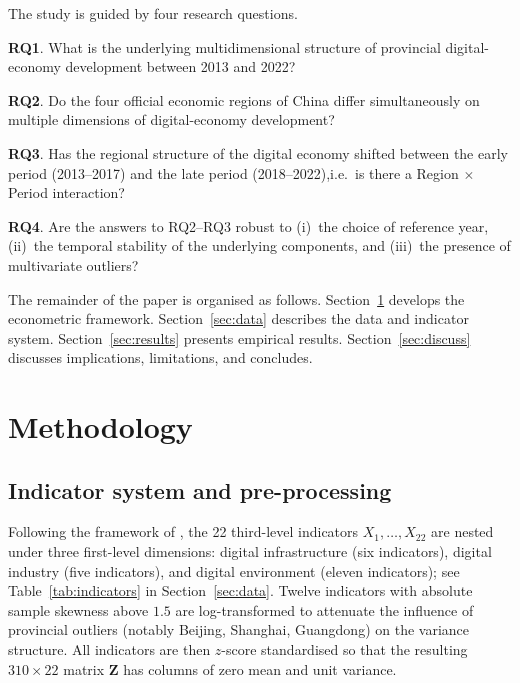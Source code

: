\documentclass[12pt,letterpaper]{article}
\begin{document}
The study is guided by four research questions.

\textbf{RQ1}. What is the underlying multidimensional structure of provincial digital-economy development between 2013 and 2022?

\textbf{RQ2}. Do the four official economic regions of China differ simultaneously on multiple dimensions of digital-economy development?

\textbf{RQ3}. Has the regional structure of the digital economy shifted between the early period (2013--2017) and the late period (2018--2022),i.e.~is there a Region $\times$ Period interaction?

\textbf{RQ4}. Are the answers to RQ2--RQ3 robust to (i)~the choice of reference year, (ii)~the temporal stability of the underlying components, and (iii)~the presence of multivariate outliers?


The remainder of the paper is organised as follows.  Section~\ref{sec:method}
develops the econometric framework.  Section~\ref{sec:data} describes the data
and indicator system.  Section~\ref{sec:results} presents empirical results.
Section~\ref{sec:discuss} discusses implications, limitations, and concludes.

\section{Methodology}\label{sec:method}

\subsection{Indicator system and pre-processing}

Following the framework of \citet{he2023}, the 22 third-level indicators
$X_{1},\dots,X_{22}$ are nested under three first-level dimensions: digital
infrastructure (six indicators), digital industry (five indicators), and
digital environment (eleven indicators); see Table~\ref{tab:indicators} in
Section~\ref{sec:data}.  Twelve indicators with absolute sample skewness above
$1.5$ are log-transformed to attenuate the influence of provincial outliers
(notably Beijing, Shanghai, Guangdong) on the variance structure.  All
indicators are then $z$-score standardised so that the resulting
$310 \times 22$ matrix $\bm{Z}$ has columns of zero mean and unit variance.
\end{document}
